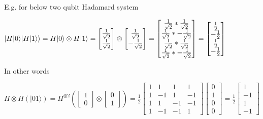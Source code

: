 \documentclass[11pt, fleqn]{article}
\begin{document}
E.g. for below two qubit Hadamard system

$|H|0\rangle |H|1\rangle\rangle =
H|0\rangle \otimes H|1\rangle =
\begin{bmatrix}\frac{1}{\sqrt 2}\\\frac{1}{\sqrt 2}\end{bmatrix} \otimes
\begin{bmatrix}\frac{1}{\sqrt 2}\\-\frac{1}{\sqrt 2}\end{bmatrix} =
\begin{bmatrix}\frac{1}{\sqrt 2}*\frac{1}{\sqrt 2}\\
\frac{1}{\sqrt 2}*-\frac{1}{\sqrt 2}\\
\frac{1}{\sqrt 2}*\frac{1}{\sqrt 2}\\
\frac{1}{\sqrt 2}*-\frac{1}{\sqrt 2}\end{bmatrix}=
\begin{bmatrix}\frac{1}{2}\\
-\frac{1}{2}\\
\frac{1}{2}\\
-\frac{1}{2}\end{bmatrix}
\\~\\$

In other words

$H\otimes H(|01\rangle) =
H^{\otimes 2} \left( \begin{bmatrix}1 \\ 0 \end{bmatrix}\otimes \begin{bmatrix}0\\1 \end{bmatrix} \right) =
\frac{1}{2}\begin{bmatrix}1 &1 &1 &1 \\ 1 &-1 &1 &-1 \\ 1 &1 &-1 &-1 \\ 1 &-1 &-1 &1 \end{bmatrix}\begin{bmatrix}0\\ 1\\ 0\\ 0\end{bmatrix} =
\frac{1}{2}\begin{bmatrix}1\\ -1\\ 1\\ -1\end{bmatrix}$

\pagebreak
\end{document}
